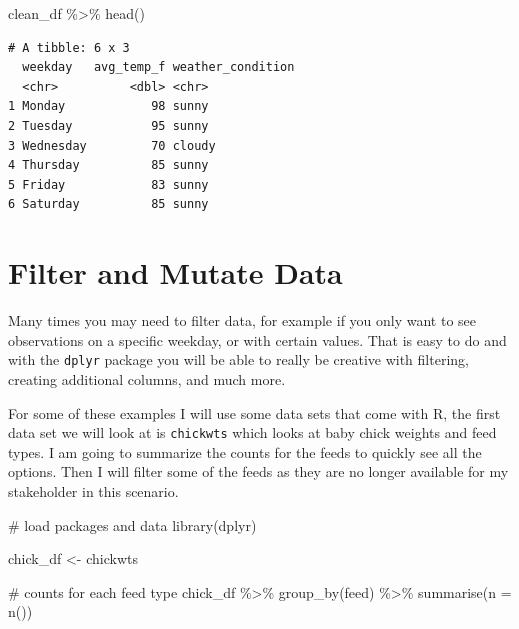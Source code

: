 \documentclass[
  letterpaper,
  DIV=11,
  numbers=noendperiod]{scrreprt}
\newenvironment{Shaded}{\begin{snugshade}}{\end{snugshade}}
\newcommand{\AttributeTok}[1]{\textcolor[rgb]{0.40,0.45,0.13}{#1}}
\newcommand{\CommentTok}[1]{\textcolor[rgb]{0.37,0.37,0.37}{#1}}
\newcommand{\FunctionTok}[1]{\textcolor[rgb]{0.28,0.35,0.67}{#1}}
\newcommand{\NormalTok}[1]{\textcolor[rgb]{0.00,0.23,0.31}{#1}}
\newcommand{\OtherTok}[1]{\textcolor[rgb]{0.00,0.23,0.31}{#1}}
\newcommand{\SpecialCharTok}[1]{\textcolor[rgb]{0.37,0.37,0.37}{#1}}
\begin{document}
\begin{Shaded}
\begin{Highlighting}[]
\NormalTok{clean\_df }\SpecialCharTok{\%\textgreater{}\%}
  \FunctionTok{head}\NormalTok{()}
\end{Highlighting}
\end{Shaded}

\begin{verbatim}
# A tibble: 6 x 3
  weekday   avg_temp_f weather_condition
  <chr>          <dbl> <chr>            
1 Monday            98 sunny            
2 Tuesday           95 sunny            
3 Wednesday         70 cloudy           
4 Thursday          85 sunny            
5 Friday            83 sunny            
6 Saturday          85 sunny            
\end{verbatim}

\hypertarget{filter-and-mutate-data}{%
\section{\texorpdfstring{\textbf{Filter and Mutate
Data}}{Filter and Mutate Data}}\label{filter-and-mutate-data}}

Many times you may need to filter data, for example if you only want to
see observations on a specific weekday, or with certain values. That is
easy to do and with the \texttt{dplyr} package you will be able to
really be creative with filtering, creating additional columns, and much
more.

For some of these examples I will use some data sets that come with R,
the first data set we will look at is \texttt{chickwts} which looks at
baby chick weights and feed types. I am going to summarize the counts
for the feeds to quickly see all the options. Then I will filter some of
the feeds as they are no longer available for my stakeholder in this
scenario.

\begin{Shaded}
\begin{Highlighting}[]
\CommentTok{\# load packages and data }
\FunctionTok{library}\NormalTok{(dplyr)}

\NormalTok{chick\_df }\OtherTok{\textless{}{-}}\NormalTok{ chickwts}

\CommentTok{\# counts for each feed type}
\NormalTok{chick\_df }\SpecialCharTok{\%\textgreater{}\%}
  \FunctionTok{group\_by}\NormalTok{(feed) }\SpecialCharTok{\%\textgreater{}\%}
  \FunctionTok{summarise}\NormalTok{(}\AttributeTok{n =} \FunctionTok{n}\NormalTok{())}
\end{Highlighting}
\end{Shaded}
\end{document}
